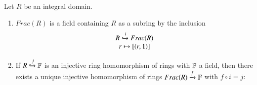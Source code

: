 \begin{theorem}
    Let $R$ be an integral domain.
    \begin{enumerate}
        \item $Frac(R)$ is a field containing $R$ as a subring by the inclusion \begin{equation}
            \begin{array}{c} R\xhookrightarrow{i} Frac(R) \\ r\mapsto [(r,1)] \end{array}
        \end{equation}
        \item If $R \xhookrightarrow{j} \mathbb F$ is an injective ring homomorphism of rings with $\mathbb F$ a field, then there exists a unique injective homomorphism of rings $Frac(R) \xrightarrow{f}\mathbb F$ with $f \circ i = j$:
        \begin{center}
        \end{center}
    \end{enumerate}
\end{theorem}
